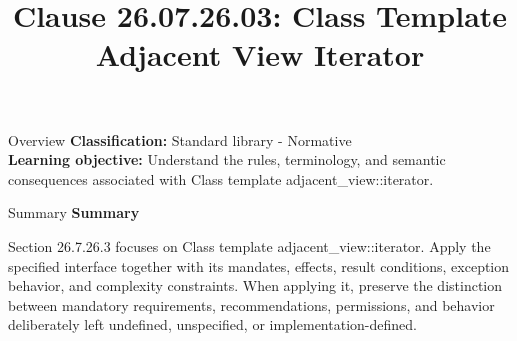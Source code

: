 \documentclass[10pt,letterpaper]{article}
\title{Clause 26.07.26.03: Class Template Adjacent View Iterator}
\author{}
\date{}
\begin{document}
\maketitle
\begin{CornellOverviewBox}{Overview}
\textbf{Classification:} Standard library - Normative\\[2pt]
\textbf{Learning objective:} Understand the rules, terminology, and semantic consequences associated with Class template adjacent\_view::iterator.
\end{CornellOverviewBox}\begin{CornellSummaryBox}{Summary}
{\sffamily\bfseries\color{Accent} Summary}\par\vspace{3pt}Section 26.7.26.3 focuses on Class template adjacent\_view::iterator. Apply the specified interface together with its mandates, effects, result conditions, exception behavior, and complexity constraints. When applying it, preserve the distinction between mandatory requirements, recommendations, permissions, and behavior deliberately left undefined, unspecified, or implementation-defined.
\end{CornellSummaryBox}
\end{document}
